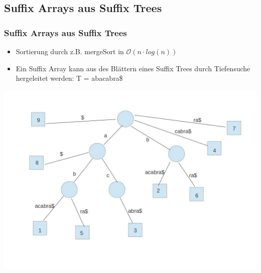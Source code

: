 \documentclass{beamer}
\begin{document}
\subsection{Suffix Arrays aus Suffix Trees}
\begin{frame}
\frametitle{Suffix Arrays aus Suffix Trees} %
\begin{itemize}
\item Sortierung durch z.B. mergeSort in $\mathcal{O}(n\cdot log (n))$
\item Ein Suffix Array kann aus des Blättern eines Suffix Trees durch Tiefensuche hergeleitet werden: T = \glqq abacabra\$\grqq\newline
\end{itemize}
\includegraphics[height=0.5\textheight]{SuffixTree.jpg}
\end{frame}
\end{document}
